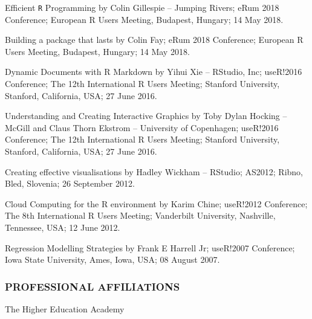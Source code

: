 \documentclass[
]{article}
\begin{document}
Efficient \texttt{R} Programming by Colin Gillespie -- Jumping Rivers;
eRum 2018 Conference; European R Users Meeting, Budapest, Hungary; 14
May 2018.

Building a package that lasts by Colin Fay; eRum 2018 Conference;
European R Users Meeting, Budapest, Hungary; 14 May 2018.

Dynamic Documents with R Markdown by Yihui Xie -- RStudio, Inc;
useR!2016 Conference; The 12th International R Users Meeting; Stanford
University, Stanford, California, USA; 27 June 2016.

Understanding and Creating Interactive Graphics by Toby Dylan Hocking --
McGill and Claus Thorn Ekstrom -- University of Copenhagen; useR!2016
Conference; The 12th International R Users Meeting; Stanford University,
Stanford, California, USA; 27 June 2016.

Creating effective visualisations by Hadley Wickham -- RStudio; AS2012;
Ribno, Bled, Slovenia; 26 September 2012.

Cloud Computing for the R environment by Karim Chine; useR!2012
Conference; The 8th International R Users Meeting; Vanderbilt
University, Nashville, Tennessee, USA; 12 June 2012.

Regression Modelling Strategies by Frank E Harrell Jr; useR!2007
Conference; Iowa State University, Ames, Iowa, USA; 08 August 2007.

\hypertarget{professional-affiliations}{%
\subsubsection{PROFESSIONAL
AFFILIATIONS}\label{professional-affiliations}}

The Higher Education Academy
\end{document}
